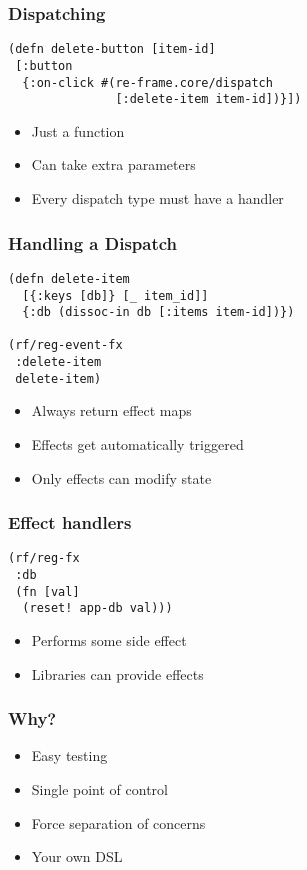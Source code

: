 \documentclass{beamer}
\begin{document}
  \begin{frame}[fragile]
    \frametitle{Dispatching}
    \begin{verbatim}
(defn delete-button [item-id]
 [:button
  {:on-click #(re-frame.core/dispatch
               [:delete-item item-id])}])
    \end{verbatim}
    \begin{itemize}
      \item Just a function
      \item Can take extra parameters
      \item Every dispatch type must have a handler
    \end{itemize}
  \end{frame}

  \begin{frame}[fragile]
    \frametitle{Handling a Dispatch}
    \begin{verbatim}
(defn delete-item
  [{:keys [db]} [_ item_id]]
  {:db (dissoc-in db [:items item-id])})

(rf/reg-event-fx
 :delete-item
 delete-item)
    \end{verbatim}
    \begin{itemize}
      \item Always return effect maps
      \item Effects get automatically triggered
      \item Only effects can modify state
    \end{itemize}
  \end{frame}

  \begin{frame}[fragile]
    \frametitle{Effect handlers}
    \begin{verbatim}
(rf/reg-fx
 :db
 (fn [val]
  (reset! app-db val)))
    \end{verbatim}
    \begin{itemize}
      \item Performs some side effect
      \item Libraries can provide effects
    \end{itemize}
  \end{frame}

  \begin{frame}
    \frametitle{Why?}
    \begin{itemize}
      \item Easy testing
      \item Single point of control
      \item Force separation of concerns
      \item Your own DSL
    \end{itemize}
  \end{frame}
\end{document}
